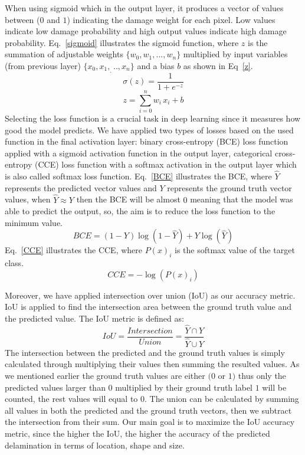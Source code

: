 When using sigmoid which in the output layer, it produces a vector of values between (\(0\) and \(1\)) indicating the damage weight for each pixel. 
Low values indicate low damage probability and high output values indicate high damage probability. Eq.~\ref{sigmoid} illustrates the sigmoid function, where \(z\) is the summation of adjustable weights \(\{w_0,w_1,...,w_n \}\) multiplied by input variables (from previous layer) \(\{x_0,x_1,_...,x_n\}\) and a bias \(b\) as shown in Eq~\ref{z}.	
	\begin{equation}
		\sigma(z) = \frac{1}{1+e^{-z}}
		\label{sigmoid}
	\end{equation}
	\begin{equation}
		z= \sum_{i=0}^{n}  w_i\, x_i +b
		\label{z}
	\end{equation}
Selecting the loss function is a crucial task in deep learning since it measures how good the model predicts.
We have applied two types of losses based on the used function in the final activation layer: binary cross-entropy (BCE) loss function applied with a sigmoid activation function in the output layer, categorical cross-entropy (CCE) loss function with a softmax activation in the output layer which is also called softmax loss function.
Eq.~\ref{BCE} illustrates the BCE, where \(\hat{Y}\) represents the predicted vector values and \(Y\) represents the ground truth vector values, when \(\hat{Y} \approx Y\) then the BCE will be almost \(0\) meaning that the model was able to predict the output, so, the aim is to reduce the loss function to the minimum value.
	\begin{equation}
		BCE = (1-Y)\log(1-\hat{Y})+Y\log(\hat{Y})
		\label{BCE}
	\end{equation}
Eq.~\ref{CCE} illustrates the CCE, where \( P(x)_{i}\) is the softmax value of the target class. 
	\begin{equation}
	CCE = -\log\left( P(x)_{i} \right)
	\label{CCE}
	\end{equation}

Moreover, we have applied intersection over union (IoU) as our accuracy metric. 
IoU is applied to find the intersection area between the ground truth value and the predicted value.  
The IoU metric is defined as:
\begin{equation}
IoU = \frac{Intersection}{Union} = \frac{\hat{Y} \cap Y}{\hat{Y} \cup Y} 
\label{IoU}
\end{equation}
The intersection between the predicted and the ground truth values is simply calculated through multiplying their values then summing the resulted values.
As we mentioned earlier the ground truth values are either \((0\) or \(1)\) thus only the predicted values larger than \(0\) multiplied by their ground truth label \(1\) will be counted, the rest values will equal to \(0\). 
The union can be calculated by summing all values in both the predicted and the ground truth  vectors, then we subtract the intersection from their sum.
Our main goal is to maximize the IoU accuracy metric, since the higher the IoU, the higher the accuracy of the predicted delamination in terms of location, shape and size.
	
